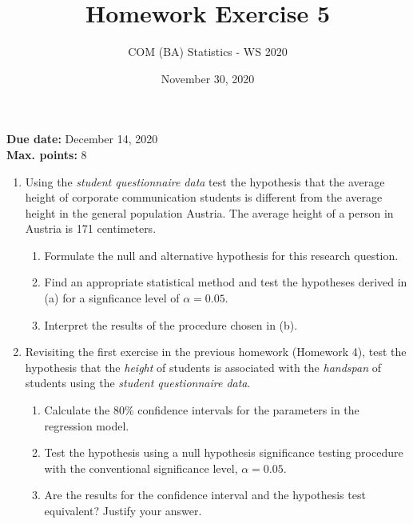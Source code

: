 \documentclass[a4paper, fleqn]{article}
\title{Homework Exercise 5}
\author{COM (BA) Statistics - WS 2020}
\date{November 30, 2020}
\begin{document}
\maketitle
\thispagestyle{empty}

\noindent
\textbf{Due date:} December 14, 2020 \\
\textbf{Max. points:} 8 \\

\begin{enumerate}
  \item Using the \textit{student questionnaire data} test the hypothesis that the average height of corporate communication students is different from the average height in the general population Austria. The average height of a person in Austria is 171 centimeters.

    \begin{enumerate}
      \item Formulate the null and alternative hypothesis for this research question.
      \item Find an appropriate statistical method and test the hypotheses derived in (a) for a signficance level of $\alpha = 0.05$.  
      \item Interpret the results of the procedure chosen in (b). 
    \end{enumerate}

  \item Revisiting the first exercise in the previous homework (Homework 4), test the hypothesis that the \textit{height} of students is associated with the \textit{handspan} of students using the \textit{student questionnaire data}.
    \begin{enumerate}
      \item Calculate the 80\% confidence intervals for the parameters in the regression model. 
      \item Test the hypothesis using a null hypothesis significance testing procedure with the conventional significance level, $\alpha = 0.05$. 
      \item Are the results for the confidence interval and the hypothesis test equivalent? Justify your answer.
    \end{enumerate}


\end{enumerate}
\end{document}
